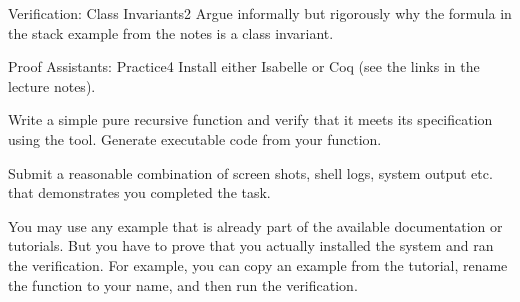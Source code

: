 \documentclass[a4paper]{article}
\begin{document}
\header

\begin{problem}{Verification: Class Invariants}{2}
Argue informally but rigorously why the formula in the stack example from the notes is a class invariant.
\end{problem}

%
%

%
%


\begin{problem}{Proof Assistants: Practice}{4}
Install either Isabelle or Coq (see the links in the lecture notes).

Write a simple pure recursive function and verify that it meets its specification using the tool.
Generate executable code from your function.
\medskip

Submit a reasonable combination of screen shots, shell logs, system output etc. that demonstrates you completed the task.

You may use any example that is already part of the available documentation or tutorials.
But you have to prove that you actually installed the system and ran the verification.
For example, you can copy an example from the tutorial, rename the function to your name, and then run the verification.
\end{problem}
\end{document}

